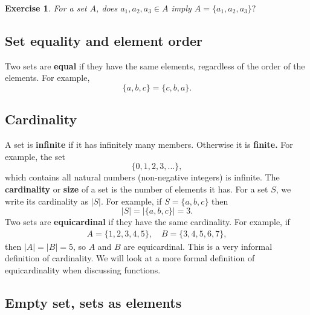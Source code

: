 \documentclass{article}[12pt]
\newtheorem{exercise}{Exercise}
\begin{document}
            \begin{exercise}
                For a set $A$, does $a_1, a_2, a_3 \in A$ imply $A = \{a_1, a_2, a_3\}?$
            \end{exercise}
            
            
        \subsection{Set equality and element order}
            
            Two sets are \textbf{equal} if they have the same elements, regardless of the order of the elements. For example,
            \begin{equation}
                \{a, b, c\} = \{c, b, a\}.
            \end{equation}
            
        \subsection{Cardinality}
            
            A set is \textbf{infinite} if it has infinitely many members. Otherwise it is \textbf{finite.} For example, the set
            \begin{equation}
                \{0, 1, 2, 3, ...\}, \label{naturals}
            \end{equation}
            which contains all natural numbers (non-negative integers) is infinite. The \textbf{cardinality} or \textbf{size} of a set is the number of elements it has. For a set $S$, we write its cardinality as $|S|.$ For example, if $S = \{a, b, c\}$ then
            \begin{equation}
                |S| = |\{a, b, c\}| = 3.
            \end{equation}
            Two sets are \textbf{equicardinal} if they have the same cardinality. For example, if
            \begin{align}
                A = \{1, 2, 3, 4, 5\}, \quad B = \{3, 4, 5, 6, 7\},
            \end{align}
            then $|A| = |B| = 5$, so $A$ and $B$ are equicardinal. This is a very informal definition of cardinality. We will look at a more formal definition of equicardinality when discussing functions.
            
        \subsection{Empty set, sets as elements}
        
\end{document}
